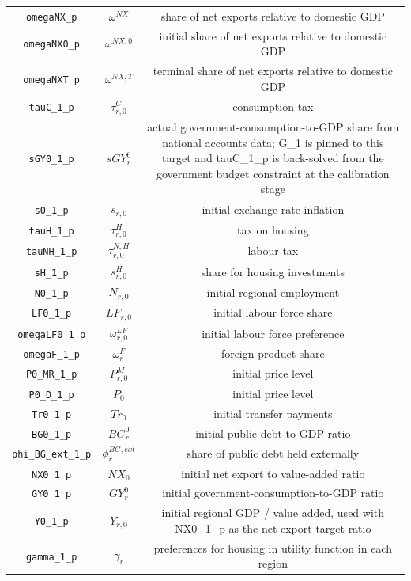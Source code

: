 \begin{center}
\begin{longtable}{ccc}
\texttt{omegaNX\_p} & ${\omega^{NX}}$ & share of net exports relative to domestic GDP\\
\texttt{omegaNX0\_p} & ${\omega^{NX,0}}$ & initial share of net exports relative to domestic GDP\\
\texttt{omegaNXT\_p} & ${\omega^{NX,T}}$ & terminal share of net exports relative to domestic GDP\\
\texttt{tauC\_1\_p} & ${\tau^{C}_{r,0}}$ & consumption tax\\
\texttt{sGY0\_1\_p} & ${sGY^0_r}$ & actual government-consumption-to-GDP share from national accounts data; G\_1 is pinned to this target and tauC\_1\_p is back-solved from the government budget constraint at the calibration stage\\
\texttt{s0\_1\_p} & ${s_{r,0}}$ & initial exchange rate inflation\\
\texttt{tauH\_1\_p} & ${\tau^{H}_{r,0}}$ & tax on housing\\
\texttt{tauNH\_1\_p} & ${\tau^{N,H}_{r,0}}$ & labour tax\\
\texttt{sH\_1\_p} & ${s_{r,0}^H}$ & share for housing investments\\
\texttt{N0\_1\_p} & ${N_{r,0}}$ & initial regional employment\\
\texttt{LF0\_1\_p} & ${LF_{r,0}}$ & initial labour force share\\
\texttt{omegaLF0\_1\_p} & ${\omega^{LF}_{r,0}}$ & initial labour force preference\\
\texttt{omegaF\_1\_p} & ${\omega^{F}_{r}}$ & foreign product share\\
\texttt{P0\_MR\_1\_p} & ${P^M_{r,0}}$ & initial price level\\
\texttt{P0\_D\_1\_p} & ${P_0}$ & initial price level\\
\texttt{Tr0\_1\_p} & ${Tr_0}$ & initial transfer payments\\
\texttt{BG0\_1\_p} & ${BG^0_r}$ & initial public debt to GDP ratio\\
\texttt{phi\_BG\_ext\_1\_p} & ${\phi^{BG,ext}_r}$ & share of public debt held externally\\
\texttt{NX0\_1\_p} & ${NX_0}$ & initial net export to value-added ratio\\
\texttt{GY0\_1\_p} & ${GY^0_r}$ & initial government-consumption-to-GDP ratio\\
\texttt{Y0\_1\_p} & ${Y_{r,0}}$ & initial regional GDP / value added, used with NX0\_1\_p as the net-export target ratio\\
\texttt{gamma\_1\_p} & ${\gamma_r}$ & preferences for housing in utility function in each region\\

\end{longtable}
\end{center}
